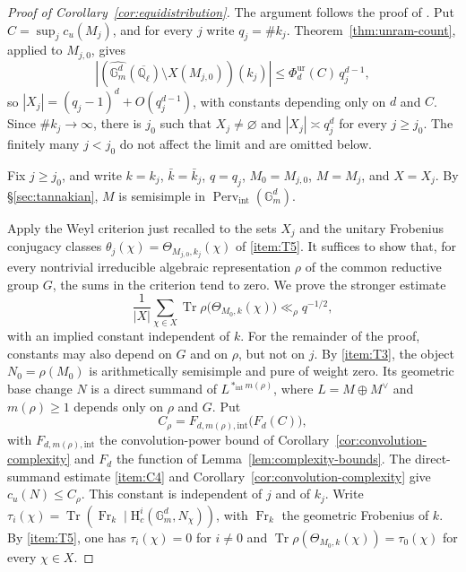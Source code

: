 \documentclass[12pt,reqno]{amsart}
\theoremstyle{definition}
\theoremstyle{plain}
\theoremstyle{definition}
\theoremstyle{remark}
\newcommand{\bbG}{\mathbb{G}}  \newcommand{\bbH}{\mathbb{H}}
\newcommand{\bbQ}{\mathbb{Q}}  \newcommand{\bbR}{\mathbb{R}}
\newcommand{\HH}{\mathrm{H}}  \newcommand{\JJ}{\mathrm{J}}
\newcommand{\ol}[1]{\overline{#1}}
\newcommand{\Ql}{\bbQ_{\ell}}
\newcommand{\Gm}{\bbG_m}
\newcommand{\Perv}{\operatorname{Perv}}
\newcommand{\cu}{c_u}
\begin{document}
\begin{proof}[Proof of Corollary~\ref{cor:equidistribution}]
The argument follows the proof of \cite[Th.~4.19]{ForeyFresanKowalski2021}.
Put \(C=\sup_j\cu(M_j)\), and for every \(j\) write \(q_j=\#k_j\).
Theorem~\ref{thm:unram-count}, applied to \(M_{j,0}\), gives
\begin{equation}
\label{eq:cor-unram}
        |(\widehat{\Gm^d}(\ol\Ql)\setminus X(M_{j,0}))(k_j)|
        \le\Phi^{\mathrm{ur}}_{d}(C)\,q_j^{d-1},
\end{equation}
so \(|X_j|=(q_j-1)^d+O(q_j^{d-1})\), with constants depending only on \(d\) and \(C\).  Since
\(\#k_j\to\infty\), there is \(j_0\) such that \(X_j\neq\varnothing\) and \(|X_j|\asymp q_j^d\) for
every \(j\ge j_0\).  The finitely many \(j<j_0\) do not affect the limit and are omitted below.

Fix \(j\ge j_0\), and write \(k=k_j\), \(\bar k=\bar k_j\), \(q=q_j\), \(M_0=M_{j,0}\), \(M=M_j\), and
\(X=X_j\).  By \S\ref{sec:tannakian}, \(M\) is semisimple in \(\Perv_{\mathrm{int}}(\Gm^d)\).

Apply the Weyl criterion just recalled to the sets \(X_j\) and the unitary Frobenius conjugacy classes
\(\theta_j(\chi)=\Theta_{M_{j,0},k_j}(\chi)\) of \ref{item:T5}.  It suffices to show that, for every
nontrivial irreducible algebraic representation \(\rho\) of the common reductive group \(G\), the sums
in the criterion tend to zero.  We prove the stronger estimate
\begin{equation}
\label{eq:cor-weyl}
        \frac{1}{|X|}\sum_{\chi\in X}\operatorname{Tr}\rho\bigl(\Theta_{M_0,k}(\chi)\bigr)\ll_\rho q^{-1/2},
\end{equation}
with an implied constant independent of \(k\).
For the remainder of the proof, constants may also depend on \(G\) and on \(\rho\), but not on \(j\).
By \ref{item:T3}, the object \(N_0=\rho(M_0)\) is arithmetically semisimple and pure of weight zero.
Its geometric base change \(N\) is a direct summand of
\(L^{\ast_{\mathrm{int}}m(\rho)}\), where \(L=M\oplus M^\vee\) and \(m(\rho)\ge1\) depends only on
\(\rho\) and \(G\).  Put
\[
        C_\rho=
        F_{d,m(\rho),\mathrm{int}}\bigl(F_{d}(C)\bigr),
\]
with \(F_{d,m(\rho),\mathrm{int}}\) the convolution-power bound of
Corollary~\ref{cor:convolution-complexity} and \(F_{d}\) the function of
Lemma~\ref{lem:complexity-bounds}.  The direct-summand estimate \ref{item:C4} and
Corollary~\ref{cor:convolution-complexity} give \(\cu(N)\le C_\rho\).  This constant is independent of
\(j\) and of \(k_j\).  Write
\(\tau_i(\chi)=\operatorname{Tr}(\operatorname{Fr}_k\mid
\HH^i_c(\Gm^d,N_\chi))\), with \(\operatorname{Fr}_k\) the geometric Frobenius of \(k\).  By
\ref{item:T5}, one has \(\tau_i(\chi)=0\) for \(i\neq0\) and
\(\operatorname{Tr}\rho(\Theta_{M_0,k}(\chi))=\tau_0(\chi)\) for every \(\chi\in X\).


\end{proof}
\end{document}
